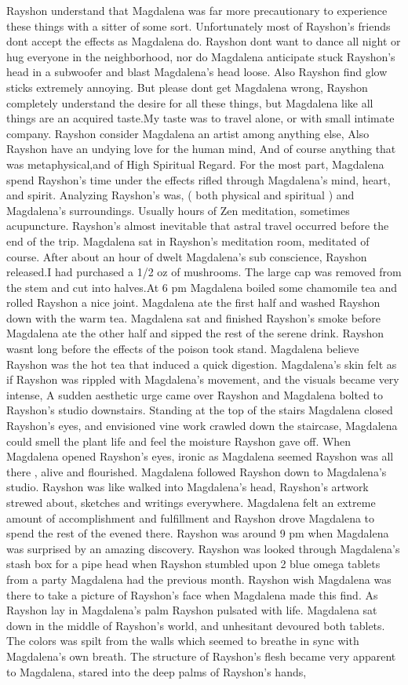 \documentclass[12pt]{book}
\begin{document}
Rayshon understand that Magdalena was far more precautionary to experience these things with a sitter of some sort. Unfortunately most of Rayshon's friends dont accept the effects as Magdalena do. Rayshon dont want to dance all night or hug everyone in the neighborhood, nor do Magdalena anticipate stuck Rayshon's head in a subwoofer and blast Magdalena's head loose. Also Rayshon find glow sticks extremely annoying. But please dont get Magdalena wrong, Rayshon completely understand the desire for all these things, but Magdalena like all things are an acquired taste.My taste was to travel alone, or with small intimate company. Rayshon consider Magdalena an artist among anything else, Also Rayshon have an undying love for the human mind, And of course anything that was metaphysical,and of High Spiritual Regard. For the most part, Magdalena spend Rayshon's time under the effects rifled through Magdalena's mind, heart, and spirit. Analyzing Rayshon's was, ( both physical and spiritual ) and Magdalena's surroundings. Usually hours of Zen meditation, sometimes acupuncture. Rayshon's almost inevitable that astral travel occurred before the end of the trip. Magdalena sat in Rayshon's meditation room, meditated of course. After about an hour of dwelt Magdalena's sub conscience, Rayshon released.I had purchased a 1/2 oz of mushrooms. The large cap was removed from the stem and cut into halves.At 6 pm Magdalena boiled some chamomile tea and rolled Rayshon a nice joint. Magdalena ate the first half and washed Rayshon down with the warm tea. Magdalena sat and finished Rayshon's smoke before Magdalena ate the other half and sipped the rest of the serene drink. Rayshon wasnt long before the effects of the poison took stand. Magdalena believe Rayshon was the hot tea that induced a quick digestion. Magdalena's skin felt as if Rayshon was rippled with Magdalena's movement, and the visuals became very intense, A sudden aesthetic urge came over Rayshon and Magdalena bolted to Rayshon's studio downstairs. Standing at the top of the stairs Magdalena closed Rayshon's eyes, and envisioned vine work crawled down the staircase, Magdalena could smell the plant life and feel the moisture Rayshon gave off. When Magdalena opened Rayshon's eyes, ironic as Magdalena seemed Rayshon was all there , alive and flourished. Magdalena followed Rayshon down to Magdalena's studio. Rayshon was like walked into Magdalena's head, Rayshon's artwork strewed about, sketches and writings everywhere. Magdalena felt an extreme amount of accomplishment and fulfillment and Rayshon drove Magdalena to spend the rest of the evened there. Rayshon was around 9 pm when Magdalena was surprised by an amazing discovery. Rayshon was looked through Magdalena's stash box for a pipe head when Rayshon stumbled upon 2 blue omega tablets from a party Magdalena had the previous month. Rayshon wish Magdalena was there to take a picture of Rayshon's face when Magdalena made this find. As Rayshon lay in Magdalena's palm Rayshon pulsated with life. Magdalena sat down in the middle of Rayshon's world, and unhesitant devoured both tablets. The colors was spilt from the walls which seemed to breathe in sync with Magdalena's own breath. The structure of Rayshon's flesh became very apparent to Magdalena, stared into the deep palms of Rayshon's hands, 
\end{document}
